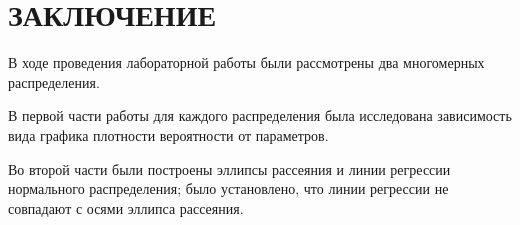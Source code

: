 \section*{ЗАКЛЮЧЕНИЕ}

В ходе проведения лабораторной работы были рассмотрены два многомерных
распределения.

В первой части работы для каждого распределения была исследована
зависимость вида графика плотности вероятности от параметров. 

Во второй части были построены эллипсы рассеяния и линии регрессии
нормального распределения; было установлено, что линии регрессии не
совпадают с осями эллипса рассеяния.

\newpage